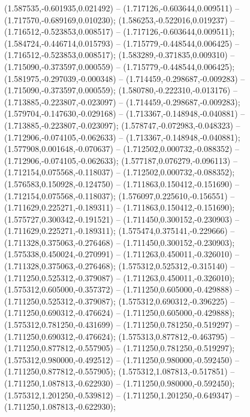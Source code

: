 (1.587535,-0.601935,0.021492) -- (1.717126,-0.603644,0.009511) -- (1.717570,-0.689169,0.010230);
 (1.586253,-0.522016,0.019237) -- (1.716512,-0.523853,0.008517) -- (1.717126,-0.603644,0.009511);
 (1.584724,-0.446714,0.015793) -- (1.715779,-0.448544,0.006425) -- (1.716512,-0.523853,0.008517);
 (1.583289,-0.371835,0.009310) -- (1.715090,-0.373597,0.000559) -- (1.715779,-0.448544,0.006425);
 (1.581975,-0.297039,-0.000348) -- (1.714459,-0.298687,-0.009283) -- (1.715090,-0.373597,0.000559);
 (1.580780,-0.222310,-0.013176) -- (1.713885,-0.223807,-0.023097) -- (1.714459,-0.298687,-0.009283);
 (1.579704,-0.147630,-0.029168) -- (1.713367,-0.148948,-0.040881) -- (1.713885,-0.223807,-0.023097);
 (1.578747,-0.072983,-0.048323) -- (1.712906,-0.074105,-0.062633) -- (1.713367,-0.148948,-0.040881);
 (1.577908,0.001648,-0.070637) -- (1.712502,0.000732,-0.088352) -- (1.712906,-0.074105,-0.062633);
 (1.577187,0.076279,-0.096113) -- (1.712154,0.075568,-0.118037) -- (1.712502,0.000732,-0.088352);
 (1.576583,0.150928,-0.124750) -- (1.711863,0.150412,-0.151690) -- (1.712154,0.075568,-0.118037);
 (1.576097,0.225610,-0.156551) -- (1.711629,0.225271,-0.189311) -- (1.711863,0.150412,-0.151690);
 (1.575727,0.300342,-0.191521) -- (1.711450,0.300152,-0.230903) -- (1.711629,0.225271,-0.189311);
 (1.575474,0.375141,-0.229666) -- (1.711328,0.375063,-0.276468) -- (1.711450,0.300152,-0.230903);
 (1.575338,0.450024,-0.270991) -- (1.711263,0.450011,-0.326010) -- (1.711328,0.375063,-0.276468);
 (1.575312,0.525312,-0.315140) -- (1.711250,0.525312,-0.379087) -- (1.711263,0.450011,-0.326010);
 (1.575312,0.605000,-0.357372) -- (1.711250,0.605000,-0.429888) -- (1.711250,0.525312,-0.379087);
 (1.575312,0.690312,-0.396225) -- (1.711250,0.690312,-0.476624) -- (1.711250,0.605000,-0.429888);
 (1.575312,0.781250,-0.431699) -- (1.711250,0.781250,-0.519297) -- (1.711250,0.690312,-0.476624);
 (1.575313,0.877812,-0.463795) -- (1.711250,0.877812,-0.557905) -- (1.711250,0.781250,-0.519297);
 (1.575312,0.980000,-0.492512) -- (1.711250,0.980000,-0.592450) -- (1.711250,0.877812,-0.557905);
 (1.575312,1.087813,-0.517851) -- (1.711250,1.087813,-0.622930) -- (1.711250,0.980000,-0.592450);
 (1.575312,1.201250,-0.539812) -- (1.711250,1.201250,-0.649347) -- (1.711250,1.087813,-0.622930);
